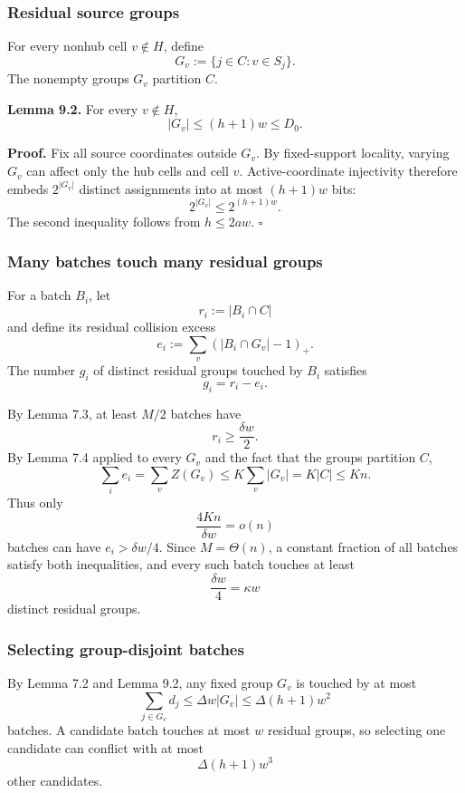 \documentclass[
]{article}
\begin{document}
\hypertarget{residual-source-groups}{%
\subsubsection{Residual source groups}\label{residual-source-groups}}

For every nonhub cell \(v\notin H\), define \[
G_v:=\{j\in C:v\in S_j\}.
\] The nonempty groups \(G_v\) partition \(C\).

\textbf{Lemma 9.2.} For every \(v\notin H\), \[
|G_v|\le(h+1)w\le D_0.
\]

\textbf{Proof.} Fix all source coordinates outside \(G_v\). By
fixed-support locality, varying \(G_v\) can affect only the hub cells
and cell \(v\). Active-coordinate injectivity therefore embeds
\(2^{|G_v|}\) distinct assignments into at most \((h+1)w\) bits: \[
2^{|G_v|}\le2^{(h+1)w}.
\] The second inequality follows from \(h\le2aw\). \(\square\)

\hypertarget{many-batches-touch-many-residual-groups}{%
\subsubsection{Many batches touch many residual
groups}\label{many-batches-touch-many-residual-groups}}

For a batch \(B_i\), let \[
r_i:=|B_i\cap C|
\] and define its residual collision excess \[
e_i:=\sum_v(|B_i\cap G_v|-1)_+.
\] The number \(g_i\) of distinct residual groups touched by \(B_i\)
satisfies \[
g_i=r_i-e_i.
\]

By Lemma 7.3, at least \(M/2\) batches have \[
r_i\ge\frac{\delta w}{2}.
\] By Lemma 7.4 applied to every \(G_v\) and the fact that the groups
partition \(C\), \[
\sum_i e_i
=
\sum_v Z(G_v)
\le
K\sum_v|G_v|
=
K|C|
\le Kn.
\] Thus only \[
\frac{4Kn}{\delta w}=o(n)
\] batches can have \(e_i>\delta w/4\). Since \(M=\Theta(n)\), a
constant fraction of all batches satisfy both inequalities, and every
such batch touches at least \[
\frac{\delta w}{4}
=
\kappa w
\] distinct residual groups.

\hypertarget{selecting-group-disjoint-batches}{%
\subsubsection{Selecting group-disjoint
batches}\label{selecting-group-disjoint-batches}}

By Lemma 7.2 and Lemma 9.2, any fixed group \(G_v\) is touched by at
most \[
\sum_{j\in G_v}d_j
\le
\Delta w|G_v|
\le
\Delta(h+1)w^2
\] batches. A candidate batch touches at most \(w\) residual groups, so
selecting one candidate can conflict with at most \[
\Delta(h+1)w^3
\] other candidates.
\end{document}
